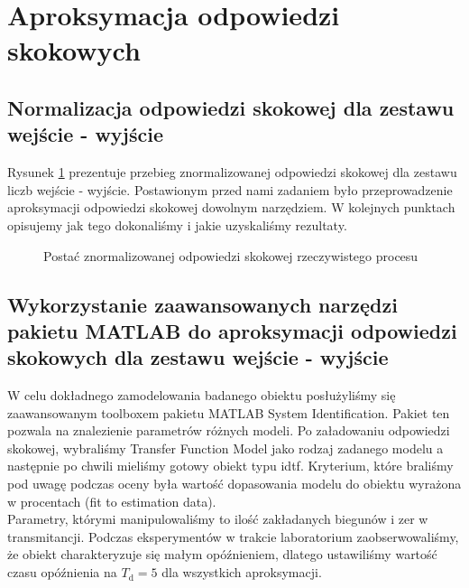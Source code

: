\section{Aproksymacja odpowiedzi skokowych}
\label{zad3_lab_opis}
\subsection{Normalizacja odpowiedzi skokowej dla zestawu wejście - wyjście}
Rysunek \ref{lab3_odp_skok_s} prezentuje przebieg znormalizowanej odpowiedzi skokowej dla zestawu liczb wejście - wyjście. Postawionym przed nami zadaniem było przeprowadzenie aproksymacji odpowiedzi skokowej dowolnym narzędziem. W kolejnych punktach opisujemy jak tego dokonaliśmy i jakie uzyskaliśmy rezultaty. 
\begin{figure}[b]
    \centering
    \caption{Postać znormalizowanej odpowiedzi skokowej rzeczywistego procesu}
    \label{lab3_odp_skok_s}
\end{figure}
\FloatBarrier

\subsection{Wykorzystanie zaawansowanych narzędzi pakietu MATLAB do aproksymacji odpowiedzi skokowych dla zestawu wejście - wyjście}
W celu dokładnego zamodelowania badanego obiektu posłużyliśmy
się zaawansowanym toolboxem pakietu MATLAB System Identification.
Pakiet ten pozwala na znalezienie parametrów różnych modeli. Po załadowaniu
odpowiedzi skokowej, wybraliśmy Transfer Function Model jako rodzaj zadanego
modelu a następnie po chwili mieliśmy gotowy obiekt typu idtf. Kryterium, które braliśmy pod uwagę podczas oceny była wartość dopasowania modelu do obiektu wyrażona w procentach (fit to estimation data). \\
\indent Parametry, którymi manipulowaliśmy to ilość zakładanych biegunów i zer w transmitancji. Podczas eksperymentów w trakcie laboratorium zaobserwowaliśmy, że obiekt charakteryzuje się małym opóźnieniem, dlatego ustawiliśmy wartość czasu opóźnienia na $T_{\mathrm{d}}=5$ dla wszystkich aproksymacji. 
\\
